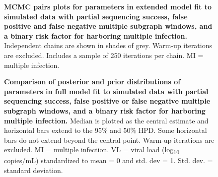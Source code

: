 \documentclass[10pt,letterpaper]{article}
\begin{document}
\begin{figure}[!ht]
\caption{{\bf MCMC pairs plots for parameters in  extended model fit to simulated data with partial sequencing success, false positive and false negative multiple subgraph windows, and a binary risk factor for harboring multiple infection.} Independent chains are shown in shades of grey. Warm-up iterations are excluded. Includes a sample of 250 iterations per chain. MI = multiple infection. }
\end{figure}

\begin{figure}[!ht]
\caption{{\bf Comparison of posterior and prior distributions of parameters in full model fit to simulated data with partial sequencing success, false positive or false negative multiple subgraph windows, and a binary risk factor for harboring multiple infection.} Median is plotted as the central estimate and horizontal bars extend to the 95\% and 50\% HPD. Some horizontal bars do not extend beyond the central point. Warm-up iterations are excluded. MI = multiple infection. VL = viral load (log\textsubscript{10} copies/mL) standardized to mean = 0 and std. dev = 1. Std. dev. = standard deviation. }
\end{figure}
\end{document}
